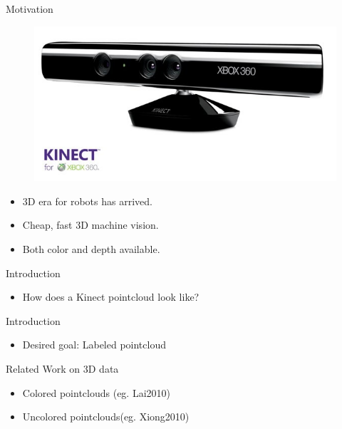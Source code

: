 \documentclass{beamer}
\begin{document}
\begin{frame}{Motivation}
	\begin{figure}[t!]
		\includegraphics[width=.5\linewidth]{kinect.jpg}
	\end{figure}

	\begin{itemize}
		\item 3D era for robots has arrived.
		\item Cheap, fast 3D machine vision.
		\item Both color and depth available.
	\end{itemize}

\end{frame}

\begin{frame}{Introduction}
	\begin{itemize}
		\item How does a Kinect pointcloud look like?

	\end{itemize}
\end{frame}

\begin{frame}{Introduction}
	\begin{itemize}
		\item Desired goal: Labeled pointcloud

	\end{itemize}
\end{frame}

\begin{frame}{Related Work on 3D data}

\begin{itemize}
\item Colored pointclouds (eg. Lai2010)
\item Uncolored pointclouds(eg. Xiong2010)
\end{itemize}
\end{frame}
\end{document}
